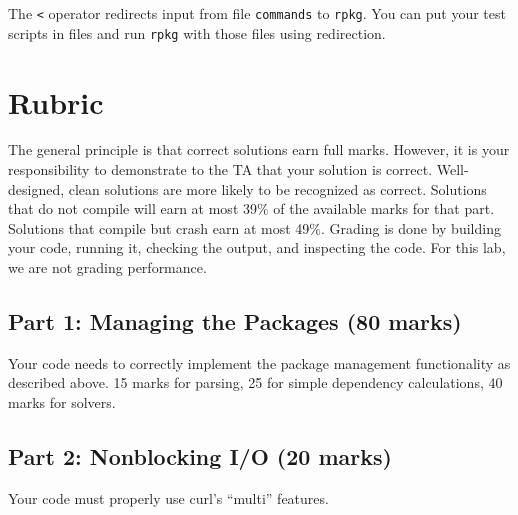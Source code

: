 \documentclass[12pt]{article}
\renewcommand{\_}{\kern-1.5pt\textunderscore\kern-1.5pt}
\begin{document}
\vspace{1em}
The \verb+<+ operator redirects input from file \texttt{commands} to \texttt{rpkg}. You can put your test scripts in files and run \texttt{rpkg} with those files using redirection.



\section*{Rubric}
The general principle is that correct solutions earn full marks. However, it is your responsibility to demonstrate to the TA that your solution is correct. Well-designed, clean solutions are more likely to be recognized as correct. Solutions that do not compile will earn at most 39$\%$ of the available marks for that part. Solutions that compile but crash earn at most 49$\%$. Grading is done by building your code, running it, checking the output, and inspecting the code. For this lab, we are not grading performance. \par

\subsection*{Part 1: Managing the Packages (80 marks) } Your code needs to correctly implement the package management functionality as described above. 15 marks for parsing, 25 for simple dependency calculations, 40 marks for solvers. \par

\subsection*{Part 2: Nonblocking I/O (20 marks) } Your code must properly use curl's ``multi'' features. \par %
\end{document}
